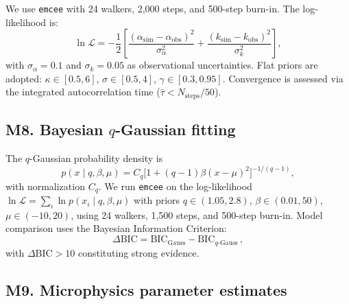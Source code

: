\documentclass[twocolumn]{article}
\begin{document}
We use \texttt{emcee}\cite{foremanmackey2013} with 24 walkers, 2{,}000 steps, and 500-step burn-in. The log-likelihood is:
\begin{equation}
\ln\mathcal{L} = -\frac{1}{2}\left[\frac{(\alpha_{\mathrm{sim}} - \alpha_{\mathrm{obs}})^2}{\sigma_\alpha^2} + \frac{(k_{\mathrm{sim}} - k_{\mathrm{obs}})^2}{\sigma_k^2}\right],
\tag{M6}
\label{eq:M6}
\end{equation}
with $\sigma_\alpha = 0.1$ and $\sigma_k = 0.05$ as observational uncertainties. Flat priors are adopted: $\kappa \in [0.5, 6]$, $\sigma \in [0.5, 4]$, $\gamma \in [0.3, 0.95]$. Convergence is assessed via the integrated autocorrelation time ($\hat{\tau} < N_{\mathrm{steps}}/50$).

\subsection*{M8. Bayesian $q$-Gaussian fitting}

The $q$-Gaussian probability density is
\begin{equation}
p(x \mid q, \beta, \mu) = C_q\bigl[1 + (q-1)\beta(x-\mu)^2\bigr]^{-1/(q-1)},
\tag{M7}
\label{eq:M7}
\end{equation}
with normalization $C_q$. We run \texttt{emcee} on the log-likelihood $\ln\mathcal{L} = \sum_i \ln p(x_i \mid q, \beta, \mu)$ with priors $q \in (1.05, 2.8)$, $\beta \in (0.01, 50)$, $\mu \in (-10, 20)$, using 24 walkers, 1{,}500 steps, and 500-step burn-in. Model comparison uses the Bayesian Information Criterion:
\begin{equation}
\Delta\mathrm{BIC} = \mathrm{BIC}_{\mathrm{Gauss}} - \mathrm{BIC}_{q\text{-Gauss}}\,,
\tag{M8}
\end{equation}
with $\Delta\mathrm{BIC} > 10$ constituting strong evidence\cite{kass1995}.

\subsection*{M9. Microphysics parameter estimates}
\end{document}
